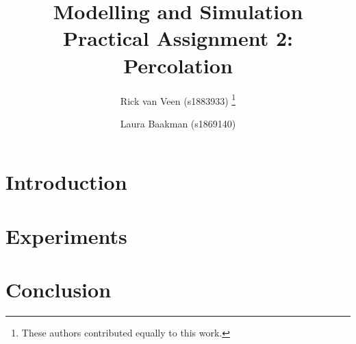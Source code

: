 \documentclass[twoside, a4paper, twocolumn, leqno, fleqn]{article}
\title{Modelling and Simulation\\Practical Assignment 2: Percolation}
\author{%
	Rick van Veen (s1883933)%
	\thanks{These authors contributed equally to this work.}%
	\and%
	Laura Baakman (s1869140)%
	\footnotemark[1]%
}
\begin{document}
\maketitle


\section{Introduction}


\section{Experiments}
	

\section{Conclusion}


\printbibliography
\end{document}
